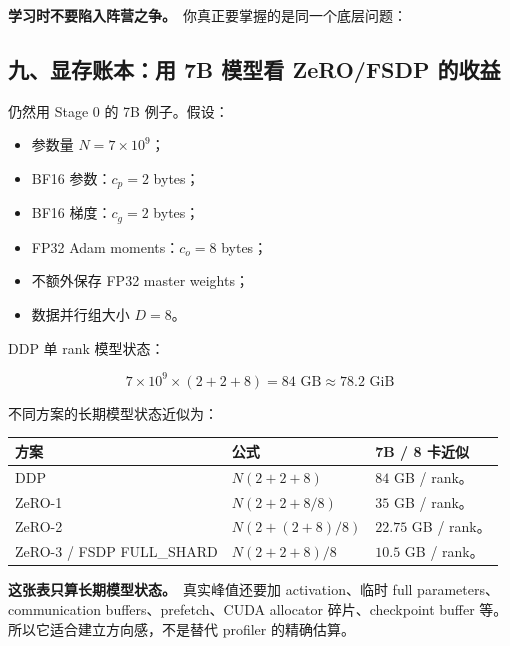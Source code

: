\begin{intubox}
\textbf{学习时不要陷入阵营之争。}\
你真正要掌握的是同一个底层问题：
\end{intubox}

\subsection{九、显存账本：用 7B 模型看 ZeRO/FSDP 的收益}

仍然用 Stage 0 的 7B 例子。假设：

\begin{itemize}[leftmargin=1.5em]
  \item 参数量 $N = 7 \times 10^9$；
  \item BF16 参数：$c_p = 2$ bytes；
  \item BF16 梯度：$c_g = 2$ bytes；
  \item FP32 Adam moments：$c_o = 8$ bytes；
  \item 不额外保存 FP32 master weights；
  \item 数据并行组大小 $D=8$。
\end{itemize}

DDP 单 rank 模型状态：

\[
7 \times 10^9 \times (2+2+8)
=84\text{ GB}
\approx78.2\text{ GiB}
\]

不同方案的长期模型状态近似为：

\begin{center}
{\small
\begin{tabular}{p{3.2cm}p{4.8cm}p{4.4cm}}
\hline
\textbf{方案} & \textbf{公式} & \textbf{7B / 8 卡近似} \\
\hline
DDP & $N(2+2+8)$ & $84$ GB / rank。 \\
ZeRO-1 & $N(2+2+8/8)$ & $35$ GB / rank。 \\
ZeRO-2 & $N(2+(2+8)/8)$ & $22.75$ GB / rank。 \\
ZeRO-3 / FSDP FULL\_SHARD & $N(2+2+8)/8$ & $10.5$ GB / rank。 \\
\hline
\end{tabular}
}
\end{center}

\begin{warnbox}
\textbf{这张表只算长期模型状态。}\
真实峰值还要加 activation、临时 full parameters、communication buffers、prefetch、CUDA allocator 碎片、checkpoint buffer 等。所以它适合建立方向感，不是替代 profiler 的精确估算。
\end{warnbox}

